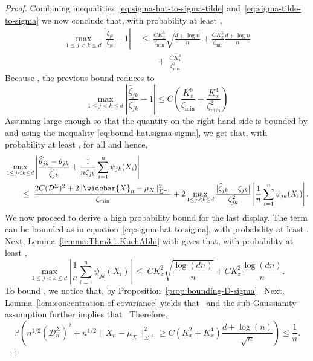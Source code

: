 \documentclass{article}
\begin{document}
\begin{appendices}
\begin{proof}
Combining inequalities~\eqref{eq:sigma-hat-to-sigma-tilde} and~\eqref{eq:sigma-tilde-to-sigma} we now conclude that, with probability at least  ,
\begin{align*}
\max_{1\le j < k\le d}\left|\frac{\widehat{\zeta}_{jk}}{\zeta_{jk}} - 1\right| ~&\le~ \frac{CK_x^6}{\zeta_{\min}}\sqrt{\frac{d + \log n}{n}} + \frac{CK_x^5}{\zeta_{\min}}\frac{d + \log n}{n}\\ ~&\qquad+~ \frac{CK_x^4}{\zeta_{\min}^2}\left.
\end{align*}
Because  , the previous bound reduces to
\begin{equation}\label{eq:sigma-hat-to-sigma}
\max_{1\le j < k\le d}\left|\frac{\widehat{\zeta}_{jk}}{\zeta_{jk}} - 1\right|
\leq C\left(\frac{K_x^6}{\zeta_{\min}} + \frac{K_x^4}{\zeta_{\min}^2}\right)\left.
\end{equation}
Assuming   large enough so that the quantity on the right hand side is bounded by   and using the inequality \eqref{eq:bound-hat.sigma-sigma}, we get that, with probability at least  ,   for all   and hence,
\begin{align*}
&\max_{1\le j < k\le d}\left|\frac{\widehat{\theta}_{jk} - \theta_{jk}}{\widehat{\zeta}_{jk}} + \frac{1}{n\zeta_{jk}}\sum_{i=1}^n \psi_{jk}(X_i)\right|\\ &\qquad\le~ \frac{2C(\mathcal{D}^{\Sigma})^2 + 2\|\widebar{X}_n - \mu_X\|_{\Sigma^{-1}}^2}{\zeta_{\min}}
+ 2\max_{1\le j < k\le d}\frac{|\widehat{\zeta}_{jk} - \zeta_{jk}|}{\zeta_{jk}^2}\left|\frac{1}{n}\sum_{i=1}^n \psi_{jk}(X_i)\right|.
\end{align*}
We now proceed to derive a high probability bound for the last display. The term   can be bounded as in equation~\eqref{eq:sigma-hat-to-sigma}, with probability at least
 . Next, Lemma~\ref{lemma:Thm3.1.KuchAbhi} with   gives that, with probability at least  ,
\begin{equation}\label{eq:bound-on-sum-psi}
\max_{1\le j < k\le d}\left|\frac{1}{n}\sum_{i=1}^n \psi_{jk}(X_i)\right| ~\le~ CK_x^2\sqrt{\frac{\log(dn)}{n}} + CK_x^2\frac{\log(dn)}{n}.
\end{equation}
To bound  , we notice that, by Proposition~\ref{prop:bounding-D-sigma}
\ Next, Lemma~\ref{lem:concentration-of-covariance} yields that
\ and the sub-Gaussianity assumption further implies that
\ Therefore,
\begin{equation}\label{eq:linear-rep-error-partial-corr}
\mathbb{P}\left(n^{1/2}(\mathcal{D}_n^{\Sigma})^2 + n^{1/2}\|\overline{X}_n - \mu_X\|_{\Sigma^{-1}}^2 \ge C(K_x^2 + K_x^4)\frac{d + \log(n)}{\sqrt{n}}\right) \le \frac{1}{n}.

\end{equation}
\end{proof}
\end{appendices}
\end{document}
